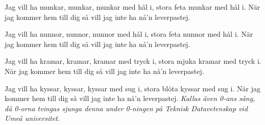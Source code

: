 \vspace{10pt}
\par
Jag vill ha munkar, munkar, munkar med hål i,
stora feta munkar med hål i.
När jag kommer hem till dig
så vill jag inte ha nå'n leverpastej.

Jag vill ha nunnor, nunnor, nunnor med hål i,
stora feta nunnor med hål i.
När jag kommer hem till dig
så vill jag inte ha nå'n leverpastej.

Jag vill ha kramar, kramar, kramar med tryck i,
stora mjuka kramar med tryck i.
När jag kommer hem till dig
så vill jag inte ha nå'n leverpastej.

Jag vill ha kyssar, kyssar, kyssar med sug i,
stora blöta kyssar med sug i.
När jag kommer hem till dig
så vill jag inte ha nå'n leverpastej.
\vspace{10pt}
{\footnotesize\textit{Kallas även 0-ans sång, då 0-orna tvingas sjunga denna under 0-ningen på Teknisk Datavetenskap vid Umeå universitet.}}
